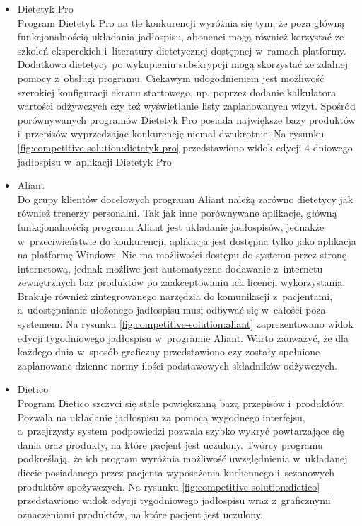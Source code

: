 \begin{itemize}
    \item Dietetyk Pro\\
        Program Dietetyk Pro\cite{url:dietetyk-pro} na tle konkurencji wyróżnia się tym, że poza główną funkcjonalnością układania jadłospisu,
        abonenci mogą również korzystać ze szkoleń eksperckich i~literatury dietetycznej dostępnej w~ramach platformy.
        Dodatkowo dietetycy po wykupieniu subskrypcji mogą skorzystać ze zdalnej pomocy z~obsługi programu.
        Ciekawym udogodnieniem jest możliwość szerokiej konfiguracji ekranu startowego, np. poprzez dodanie kalkulatora wartości odżywczych czy też wyświetlanie listy zaplanowanych wizyt.
        Spośród porównywanych programów Dietetyk Pro posiada największe bazy produktów i~przepisów wyprzedzając konkurencję niemal dwukrotnie.
        Na rysunku \ref{fig:competitive-solution:dietetyk-pro} przedstawiono widok edycji 4-dniowego jadłospisu w~aplikacji Dietetyk Pro


    \item Aliant\\
        Do grupy klientów docelowych programu Aliant\cite{url:aliant} należą zarówno dietetycy jak również trenerzy personalni.
        Tak jak inne porównywane aplikacje, główną funkcjonalnością programu Aliant jest układanie jadłospisów,
        jednakże w~przeciwieństwie do konkurencji, aplikacja jest dostępna tylko jako aplikacja na platformę Windows.
        Nie ma możliwości dostępu do systemu przez stronę internetową, jednak możliwe jest automatyczne dodawanie z~internetu zewnętrznych baz produktów po zaakceptowaniu ich licencji wykorzystania.
        Brakuje również zintegrowanego narzędzia do komunikacji z~pacjentami, a~udostępnianie ułożonego jadłospisu musi odbywać się w~całości poza systemem.
        Na rysunku \ref{fig:competitive-solution:aliant} zaprezentowano widok edycji tygodniowego jadłospisu w~programie Aliant.
        Warto zauważyć, że dla każdego dnia w~sposób graficzny przedstawiono czy zostały spełnione zaplanowane dzienne normy ilości podstawowych składników odżywczych.


    \item Dietico\\
        Program Dietico\cite{url:dietico} szczyci się stale powiększaną bazą przepisów i~produktów.
        Pozwala na układanie jadłospisu za pomocą wygodnego interfejsu,
        a~przejrzysty system podpowiedzi pozwala szybko wykryć powtarzające się dania oraz produkty, na które pacjent jest uczulony.
        Twórcy programu podkreślają, że ich program wyróżnia możliwość uwzględnienia w~układanej diecie posiadanego przez pacjenta wyposażenia kuchennego i~sezonowych produktów spożywczych.
        Na rysunku \ref{fig:competitive-solution:dietico} przedstawiono widok edycji tygodniowego jadłospisu wraz z~graficznymi oznaczeniami produktów, na które pacjent jest uczulony.


\end{itemize}

